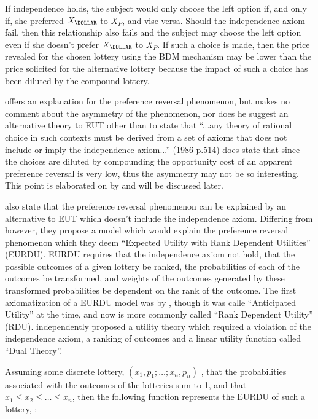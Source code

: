 \documentclass[11pt,a4paper]{report}
\begin{document}
If independence holds, the subject would only choose the left option if, and only if, she preferred $X_\DOLLAR $ to $X_P$, and vise versa.
Should the independence axiom fail, then this relationship also fails and the subject may choose the left option even if she doesn't prefer $X_\DOLLAR $ to $X_P$.
If such  a choice is made, then the price revealed for the chosen lottery using the BDM mechanism may be lower than the price solicited for the alternative lottery because the impact of such a choice has been diluted by the compound lottery. 

\textcite{Holt1986} offers an explanation for the preference reversal phenomenon, but makes no comment about the asymmetry of the phenomenon, nor does he suggest an alternative theory to EUT other than to state that \enquote{...any theory of rational choice in such contexts must be derived from a set of axioms that does not include or imply the independence axiom...} (1986 p.514) \textcite{Holt1986} does state that since the choices are diluted by compounding the opportunity cost of an apparent preference reversal is very low, thus the asymmetry may not be so interesting.
This point is elaborated on by \textcite{Harrison1989, Harrison1992} and will be discussed later. 

\textcite{Karni1987} also state that the preference reversal phenomenon can be explained by an alternative to EUT which doesn't include the independence axiom.
Differing from \textcite{Holt1986} however, they propose a model which would explain the preference reversal phenomenon which they deem \enquote{Expected Utility with Rank Dependent Utilities} (EURDU).
EURDU requires that  the independence axiom not hold, that the possible outcomes of a given lottery be ranked, the probabilities of each of the outcomes be transformed, and weights of the outcomes generated by these transformed probabilities be dependent on the rank of the outcome.
The first axiomatization of a EURDU model was by \textcite{Quiggin1982}, though it was calle \enquote{Anticipated Utility} at the time, and now is more commonly called \enquote{Rank Dependent Utility} (RDU).
\textcite{Yaari1987} independently proposed a utility theory which required a violation of the independence axiom, a ranking of outcomes and a linear utility function called \enquote{Dual Theory}.

Assuming some discrete lottery, $(x_1,p_1;\ldots;x_n,p_n)$ , that the probabilities associated with the outcomes of the lotteries sum to 1, and that $x_1 \leq x_2 \leq \ldots \leq x_n$, then the following function represents the  EURDU of such a lottery, \textcite{Karni1987}:
\end{document}
